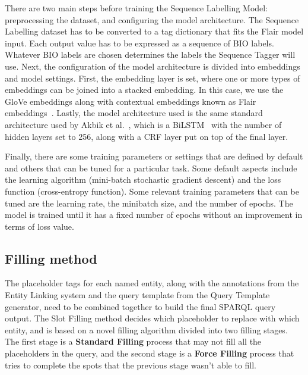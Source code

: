 There are two main steps before training the Sequence Labelling Model: preprocessing the 
dataset, and configuring the model architecture. The Sequence Labelling dataset has to be 
converted to a tag dictionary that fits the Flair model input. Each output value has to be 
expressed as a sequence of BIO labels. Whatever BIO labels are chosen determines the labels 
the Sequence Tagger will use. Next, the configuration of the model architecture is divided 
into embeddings and model settings. First, the embedding layer is set, where one or more 
types of embeddings can be joined into a stacked embedding. In this case, we use the GloVe 
embeddings along with contextual embeddings known as Flair embeddings~\cite{seqlab:flair-AkbikBBRSV19}. 
Lastly, the model architecture used is the same standard architecture used by 
Akbik et al.~\cite{seqlab:contextual-emb-AkbikBV18}, which is a BiLSTM~\cite{seqlab:HuangXY15} 
with the number of hidden layers set to 256, along with a CRF layer put on top of the final 
layer. 

Finally, there are some training parameters or settings that are defined by default and 
others that can be tuned for a particular task. Some default aspects include the learning 
algorithm (mini-batch stochastic gradient descent) and the loss function (cross-entropy 
function). Some relevant training parameters that can be tuned are the learning rate, the 
minibatch size, and the number of epochs. The model is trained until it has a fixed number of 
epochs without an improvement in terms of loss value.

\subsection{Filling method}
The placeholder tags for each named entity, along with the annotations from the Entity 
Linking system and the query template from the Query Template generator, need to be combined 
together to build the final SPARQL query output. The Slot Filling method decides which 
placeholder to replace with which entity, and is based on a novel filling algorithm divided 
into two filling stages. The first stage is a \textbf{Standard Filling} process that may not 
fill all the placeholders in the query, and the second stage is a \textbf{Force Filling} 
process that tries to complete the spots that the previous stage wasn’t able to fill.

